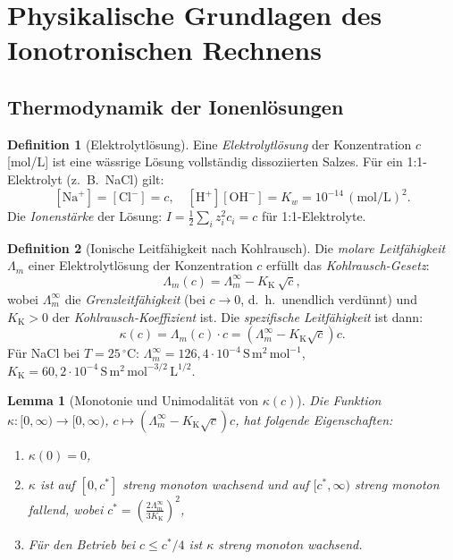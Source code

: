 ﻿\documentclass[a4paper,12pt]{article}
\theoremstyle{plain}
\newtheorem{lemma}{Lemma}
\theoremstyle{definition}
\newtheorem{definition}{Definition}
\theoremstyle{remark}
\begin{document}
\section{Physikalische Grundlagen des Ionotronischen Rechnens}

\subsection{Thermodynamik der Ionenl\"osungen}

\begin{definition}[Elektrolytl\"osung]
\label{def:elektrolyt}
Eine \emph{Elektrolytl\"osung} der Konzentration $c$ [mol/L] ist eine
wässrige L\"osung vollst\"andig dissoziierten Salzes.
F\"ur ein 1:1-Elektrolyt (z.~B.\ NaCl) gilt:
\[
[\mathrm{Na}^+] = [\mathrm{Cl}^-] = c,
\quad [\mathrm{H}^+][\mathrm{OH}^-] = K_w = 10^{-14}\,(\mathrm{mol/L})^2.
\]
Die \emph{Ionenst\"arke} der L\"osung:
$I = \frac{1}{2}\sum_i z_i^2 c_i = c$ f\"ur 1:1-Elektrolyte.
\end{definition}

\begin{definition}[Ionische Leitf\"ahigkeit nach Kohlrausch]
\label{def:leitfaehigkeit}
Die \emph{molare Leitf\"ahigkeit} $\Lambda_m$ einer Elektrolytl\"osung
der Konzentration $c$ erf\"ullt das \emph{Kohlrausch-Gesetz}:
\[
\Lambda_m(c) = \Lambda_m^\infty - K_{\mathrm{K}}\,\sqrt{c},
\]
wobei $\Lambda_m^\infty$ die \emph{Grenzleitf\"ahigkeit} (bei $c \to 0$,
d.~h.\ unendlich verd\"unnt) und $K_{\mathrm{K}} > 0$ der
\emph{Kohlrausch-Koeffizient} ist.
Die \emph{spezifische Leitf\"ahigkeit} ist dann:
\[
\kappa(c) = \Lambda_m(c) \cdot c = \left(\Lambda_m^\infty - K_{\mathrm{K}}\sqrt{c}\right) c.
\]
F\"ur NaCl bei $T = 25\,^\circ$C:
$\Lambda_m^\infty = 126{,}4 \cdot 10^{-4}\,\mathrm{S\,m^2\,mol^{-1}}$,
$K_{\mathrm{K}} = 60{,}2 \cdot 10^{-4}\,\mathrm{S\,m^2\,mol^{-3/2}\,L^{1/2}}$.
\end{definition}

\begin{lemma}[Monotonie und Unimodalit\"at von $\kappa(c)$]
\label{lem:kappa_mono}
Die Funktion $\kappa: [0, \infty) \to [0, \infty)$, $c \mapsto (\Lambda_m^\infty - K_{\mathrm{K}}\sqrt{c})c$,
hat folgende Eigenschaften:
\begin{enumerate}[label=(\roman*)]
    \item $\kappa(0) = 0$,
    \item $\kappa$ ist auf $[0, c^*]$ streng monoton wachsend und auf $[c^*, \infty)$ streng monoton fallend,
          wobei $c^* = \left(\frac{2\Lambda_m^\infty}{3K_{\mathrm{K}}}\right)^2$,
    \item F\"ur den Betrieb bei $c \leq c^*/4$ ist $\kappa$ streng monoton wachsend.
\end{enumerate}
\end{lemma}
\end{document}

